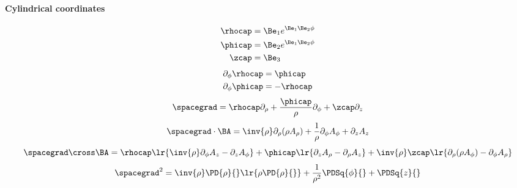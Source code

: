 \paragraph{Cylindrical coordinates}
%
\begin{equation}\label{eqn:usefulFormulas:720}
\begin{aligned}
\rhocap &= \Be_1 e^{\Be_1 \Be_2 \phi} \\
\phicap &= \Be_2 e^{\Be_1 \Be_2 \phi} \\
\zcap &= \Be_3
\end{aligned}
\end{equation}
%
\begin{equation}\label{eqn:usefulFormulas:740}
\begin{aligned}
\partial_\phi \rhocap &= \phicap \\
\partial_\phi \phicap &= -\rhocap
\end{aligned}
\end{equation}
%
\begin{dmath}\label{eqn:usefulFormulas:760}
\spacegrad = \rhocap \partial_\rho + \frac{\phicap}{\rho} \partial_\phi + \zcap \partial_z
\end{dmath}
%
\begin{dmath}\label{eqn:usefulFormulas:780}
\spacegrad \cdot \BA
=
\inv{\rho} \partial_\rho (\rho A_\rho) + \frac{1}{\rho} \partial_\phi A_\phi + \partial_z A_z
\end{dmath}
%
\begin{dmath}\label{eqn:usefulFormulas:800}
\spacegrad \cross \BA
=
\rhocap
\lr{
   \inv{\rho} \partial_\phi A_z
   - \partial_z A_\phi
}
+
\phicap
\lr{
   \partial_z A_\rho
   -\partial_\rho A_z
}
+
\inv{\rho} \zcap \lr{
   \partial_\rho ( \rho A_\phi )
   - \partial_\phi A_\rho
}
\end{dmath}
%
\begin{dmath}\label{eqn:usefulFormulas:820}
\spacegrad^2
=
\inv{\rho} \PD{\rho}{} \lr{ \rho \PD{\rho}{} }
+ \frac{1}{\rho^2} \PDSq{\phi}{}
+ \PDSq{z}{}
\end{dmath}
%
